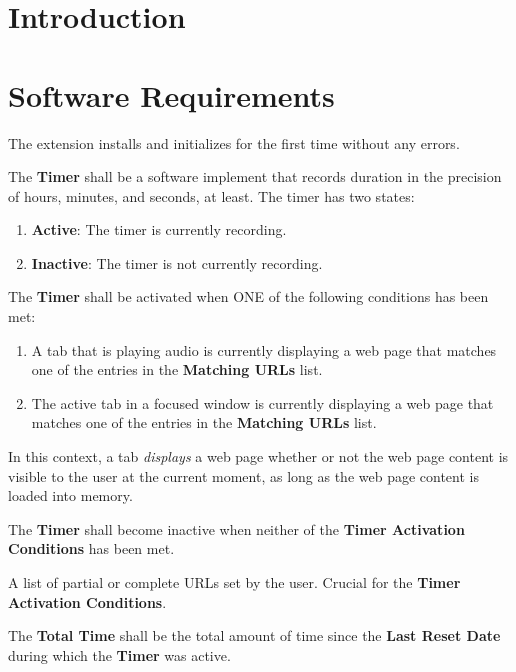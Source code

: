 \documentclass{designdoc}
\begin{document}
\section{Introduction}

\section{Software Requirements}
The extension installs and initializes for the first time without any errors.

The \textbf{Timer} shall be a software implement that records duration in the
precision of hours, minutes, and seconds, at least. The timer has two states:
\begin{enumerate}
\item \textbf{Active}: The timer is currently recording.
\item \textbf{Inactive}: The timer is not currently recording.
\end{enumerate}

The \textbf{Timer} shall be activated when ONE of the following conditions has
been met:
\begin{enumerate}
\item A tab that is playing audio is currently displaying a web page that
  matches one of the entries in the \textbf{Matching URLs} list.
\item The active tab in a focused window is currently displaying a web page
  that matches one of the entries in the \textbf{Matching URLs} list.
\end{enumerate}
In this context, a tab \textit{displays} a web page whether or not the web page
content is visible to the user at the current moment, as long as the web page
content is loaded into memory.

The \textbf{Timer} shall become inactive when neither of the \textbf{Timer
  Activation Conditions} has been met.

A list of partial or complete URLs set by the user. Crucial for the
\textbf{Timer Activation Conditions}.

The \textbf{Total Time} shall be the total amount of time since the
\textbf{Last Reset Date} during which the \textbf{Timer} was active.
\end{document}
